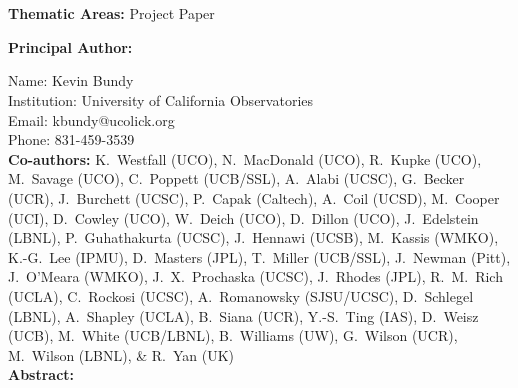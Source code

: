 \documentclass[oneside,12pt]{amsart}
\begin{document}
 \\[20pt]
\\

\noindent \textbf{Thematic Areas:} Project Paper
  
\noindent \textbf{Principal Author:}

\noindent Name:	Kevin Bundy \\
\noindent Institution:  University of California Observatories \\
\noindent Email:  kbundy@ucolick.org \\
\noindent Phone:  831-459-3539 \\
 
\noindent \textbf{Co-authors:} {\footnotesize K.~Westfall (UCO), N.~MacDonald (UCO), R.~Kupke
(UCO), M.~Savage (UCO),
C.~Poppett (UCB/SSL), A.~Alabi (UCSC), G.~Becker
(UCR), J.~Burchett (UCSC), P.~Capak (Caltech), A.~Coil (UCSD),
M.~Cooper (UCI), D.~Cowley (UCO), W.~Deich (UCO), D.~Dillon (UCO),
J.~Edelstein (LBNL), P.~Guhathakurta (UCSC), J.~Hennawi (UCSB), M.~Kassis (WMKO),
K.-G.~Lee (IPMU), D.~Masters (JPL), T.~Miller (UCB/SSL), J.~Newman
(Pitt), J.~O'Meara (WMKO), J.~X.~Prochaska (UCSC), J.~Rhodes (JPL), R.~M.~Rich (UCLA),
C.~Rockosi (UCSC), A.~Romanowsky (SJSU/UCSC), D.~Schlegel (LBNL),
A.~Shapley (UCLA), B.~Siana (UCR), Y.-S.~Ting (IAS), D.~Weisz
(UCB), M.~White (UCB/LBNL), B.~Williams (UW), G.~Wilson (UCR),
M.~Wilson (LBNL), \& R.~Yan (UK)} \\

\noindent \textbf{Abstract:} 
\end{document}
